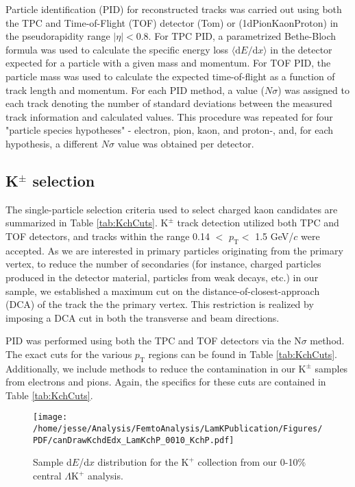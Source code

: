 \documentclass[ALICE,manyauthors]{cernphprep}
\newcommand{\pt}{$p_{\mathrm{T}}$\xspace}
\newcommand{\KchP}{$\mathrm{K^{+}}$\xspace}
\newcommand{\Kpm}{$\mathrm{K^{\pm}}$\xspace}
\newcommand{\LamKchP}{$\Lambda\mathrm{K^{+}}$\xspace}
\begin{document}
Particle identification (PID) for reconstructed tracks was carried out using both the TPC and Time-of-Flight (TOF) detector \cite{Abelev:2014ffa, Akindinov:2013tea} (Tom) or \cite{Cortese:545834} (1dPionKaonProton) in the pseudorapidity range $|\eta| < 0.8$.  
For TPC PID, a parametrized Bethe-Bloch formula was used to calculate the specific energy loss $\langle \mathrm{d}E/\mathrm{d}x \rangle$ in the detector expected for a particle with a given mass and momentum.  
For TOF PID, the particle mass was used to calculate the expected time-of-flight as a function of track length and momentum.  
For each PID method, a value ($N\sigma$) was assigned to each track denoting the number of standard deviations between the measured track information and calculated values.  
This procedure was repeated for four "particle species hypotheses" - electron, pion, kaon, and proton-, and, for each hypothesis, a different $N\sigma$ value was obtained per detector.


\subsection{K$^{\pm}$ selection}
\label{sec:KchSelection}
The single-particle selection criteria used to select charged kaon candidates are summarized in Table \ref{tab:KchCuts}.
\Kpm track detection utilized both TPC and TOF detectors, and tracks within the range 0.14 $<$ \pt $<$ 1.5 GeV/$c$ were accepted.
As we are interested in primary particles originating from the primary vertex, to reduce the number of secondaries (for instance, charged particles produced in the detector material, particles from weak decays, etc.) in our sample, we established a maximum cut on the distance-of-closest-approach (DCA) of the track the the primary vertex.
This restriction is realized by imposing a DCA cut in both the transverse and beam directions.

PID was performed using both the TPC and TOF detectors via the $\mathrm{N}\sigma$ method.  
The exact cuts for the various \pt regions can be found in Table \ref{tab:KchCuts}.  
Additionally, we include methods to reduce the contamination in our \Kpm samples from electrons and pions.  Again, the specifics for these cuts are contained in Table \ref{tab:KchCuts}.


\begin{figure}[h]
 \centering
 \texttt{[image: /home/jesse/Analysis/FemtoAnalysis/LamKPublication/Figures/PDF/canDrawKchdEdx\_LamKchP\_0010\_KchP.pdf]}%
 \caption{\label{fig:KchPdEdx} Sample d$E$/d$x$ distribution for the \KchP collection from our 0-10\% central \LamKchP analysis.}
\end{figure}
\end{document}
